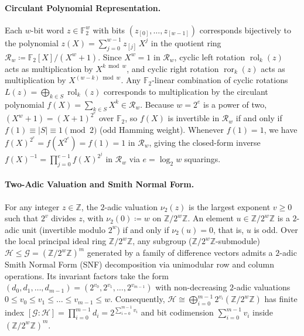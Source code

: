 \documentclass[11pt,a4paper]{article}
\theoremstyle{definition}
\theoremstyle{remark}
\newcommand{\Ftwo}{\mathbb{F}_2}
\newcommand{\Zmod}[1]{\mathbb{Z}/2^{#1}\mathbb{Z}}
\newcommand{\ror}{\operatorname{ror}}
\newcommand{\rol}{\operatorname{rol}}
\begin{document}
\paragraph{Circulant Polynomial Representation.}
Each $w$-bit word $z \in \Ftwo^w$ with bits $(z_{[0]}, \dots, z_{[w-1]})$ corresponds bijectively to the polynomial $z(X) = \sum_{j=0}^{w-1} z_{[j]}\,X^j$ in the quotient ring $\mathcal{R}_w \coloneqq \Ftwo[X]/(X^w + 1)$. Since $X^w = 1$ in $\mathcal{R}_w$, cyclic left rotation $\rol_k(z)$ acts as multiplication by $X^{k \bmod w}$, and cyclic right rotation $\ror_k(z)$ acts as multiplication by $X^{(w - k) \bmod w}$. Any $\Ftwo$-linear combination of cyclic rotations $L(z) = \bigoplus_{k \in S} \rol_k(z)$ corresponds to multiplication by the circulant polynomial $f(X) = \sum_{k \in S} X^k \in \mathcal{R}_w$. Because $w = 2^e$ is a power of two, $(X^w + 1) = (X + 1)^{2^e}$ over $\Ftwo$, so $f(X)$ is invertible in $\mathcal{R}_w$ if and only if $f(1) \equiv |S| \equiv 1 \pmod 2$ (odd Hamming weight). Whenever $f(1) = 1$, we have $f(X)^{2^e} = f(X^{2^e}) = f(1) = 1$ in $\mathcal{R}_w$, giving the closed-form inverse $f(X)^{-1} = \prod_{j=0}^{e-1} f(X)^{2^j}$ in $\mathcal{R}_w$ via $e = \log_2 w$ squarings.

\paragraph{Two-Adic Valuation and Smith Normal Form.}
For any integer $z \in \mathbb{Z}$, the $2$-adic valuation $\nu_2(z)$ is the largest exponent $v \ge 0$ such that $2^v$ divides $z$, with $\nu_2(0) \coloneqq w$ on $\Zmod{w}$. An element $u \in \Zmod{w}$ is a $2$-adic unit (invertible modulo $2^w$) if and only if $\nu_2(u) = 0$, that is, $u$ is odd. Over the local principal ideal ring $\Zmod{w}$, any subgroup ($\Zmod{w}$-submodule) $\mathcal{H} \le \mathcal{G} = (\Zmod{w})^m$ generated by a family of difference vectors admits a $2$-adic Smith Normal Form (SNF) decomposition via unimodular row and column operations. Its invariant factors take the form $(d_0, d_1, \dots, d_{m-1}) = (2^{v_0}, 2^{v_1}, \dots, 2^{v_{m-1}})$ with non-decreasing $2$-adic valuations $0 \le v_0 \le v_1 \le \dots \le v_{m-1} \le w$. Consequently, $\mathcal{H} \cong \bigoplus_{i=0}^{m-1} 2^{v_i}(\Zmod{w})$ has finite index $[\mathcal{G} : \mathcal{H}] = \prod_{i=0}^{m-1} d_i = 2^{\sum_{i=0}^{m-1} v_i}$ and bit codimension $\sum_{i=0}^{m-1} v_i$ inside $(\Zmod{w})^m$.
\end{document}
